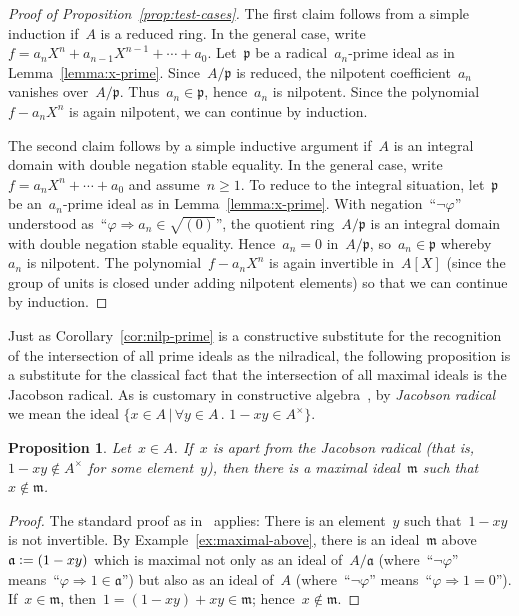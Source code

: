 \documentclass[com,11pt,crcready]{iosart2x}
\theoremstyle{definition}
\theoremstyle{plain}
\newtheorem{proposition}[definition]{Proposition}
\theoremstyle{remark}
\newcommand{\?}{\,{:}\,}
\newcommand{\aaa}{\mathfrak{a}}
\newcommand{\mmm}{\mathfrak{m}}
\newcommand{\ppp}{\mathfrak{p}}
\newcommand{\defeq}{\vcentcolon=}
\renewcommand{\_}{\mathpunct{.}\,}
\begin{document}
\begin{proof}[Proof of Proposition~\ref{prop:test-cases}]
The first claim follows from a simple induction if~$A$ is a reduced
ring.
%
In the general case, write~$f = a_n X^n + a_{n-1} X^{n-1} + \cdots + a_0$. Let~$\ppp$
be a radical~$a_n$-prime ideal as in Lemma~\ref{lemma:x-prime}. Since~$A/\ppp$
is reduced, the nilpotent coefficient~$a_n$ vanishes over~$A/\ppp$. Thus~$a_n \in \ppp$,
hence~$a_n$ is nilpotent. Since the polynomial~$f - a_n X^n$ is again
nilpotent, we can continue by induction.

The second claim follows by a simple inductive argument if~$A$ is an
integral domain with double negation stable equality.
%
In the general case, write~$f = a_n X^n + \cdots + a_0$
and assume~$n \geq 1$. To reduce to the integral situation, let~$\ppp$ be
an~$a_n$-prime ideal as in Lemma~\ref{lemma:x-prime}.
With negation~``$\neg\varphi$'' understood as~``$\varphi \Rightarrow a_n \in
\sqrt{(0)}$'', the quotient ring~$A/\ppp$ is an integral domain with double
negation stable equality.
Hence~$a_n = 0$ in~$A/\ppp$, so~$a_n \in \ppp$ whereby~$a_n$ is nilpotent. The
polynomial~$f - a_n X^n$ is again invertible in~$A[X]$ (since the group of
units is closed under adding nilpotent elements) so that we can continue by
induction.
\end{proof}

Just as Corollary~\ref{cor:nilp-prime} is a constructive substitute
for the recognition of the intersection of all prime ideals as the nilradical,
the following proposition is a substitute for the classical fact that
the intersection of all maximal ideals is the Jacobson radical.
%
As is customary in constructive
algebra~\cite[Section~IX.1]{lombardi-quitte:constructive-algebra}, by
\emph{Jacobson radical} we mean the ideal
$\{ x \in A \,|\, \forall y \in A\_ 1 - xy \in A^\times \}$.

\begin{proposition}\label{prop:jac}Let~$x \in A$. If~$x$ is \emph{apart} from the Jacobson radical (that is, $1-xy \not\in A^\times$ for some element~$y$), then
there is a maximal ideal~$\mmm$ such that~$x \not\in \mmm$.
\end{proposition}

\begin{proof}The standard proof as
in~\cite[Lemma~IX.1.1]{lombardi-quitte:constructive-algebra} applies: There is
an element~$y$ such that~$1-xy$
is not invertible. By Example~\ref{ex:maximal-above}, there is an ideal~$\mmm$
above~$\aaa \defeq (1-xy)$ which is maximal not only as an ideal of~$A/\aaa$
(where~``$\neg\varphi$'' means~``$\varphi \Rightarrow 1 \in \aaa$'') but also as an
ideal of~$A$ (where~``$\neg\varphi$'' means~``$\varphi \Rightarrow 1 = 0$''). If~$x
\in \mmm$, then~$1 = (1-xy) + xy \in \mmm$; hence~$x \not\in \mmm$.
\end{proof}
\end{document}
